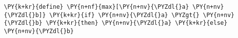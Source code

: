 \begin{Verbatim}[commandchars=\\\{\}]
\PY{k+kr}{define} \PY{n+nf}{max}[\PY{n+nv}{\PYZdl{}a} \PY{n+nv}{\PYZdl{}b]} \PY{k+kr}{if} \PY{n+nv}{\PYZdl{}a} \PYZgt{} \PY{n+nv}{\PYZdl{}b} \PY{k+kr}{then} \PY{n+nv}{\PYZdl{}a} \PY{k+kr}{else} \PY{n+nv}{\PYZdl{}b}
\end{Verbatim}
